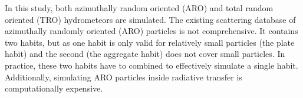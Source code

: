 \documentclass[amt, manuscript]{copernicus}
\begin{document}
	





 


In this study, both azimuthally random oriented (ARO) and total random oriented (TRO) hydrometeors are simulated. The existing scattering database of azimuthally randomly oriented (ARO) particles \citep{brath:micro:20} is not comprehensive. It contains two habits, but as one habit is only valid for relatively small particles (the plate habit) and the second (the aggregate habit) does not cover small particles. In practice, these two habits have to combined to effectively simulate a single habit. Additionally, simulating ARO particles inside radiative transfer is computationally expensive.





\end{document}

